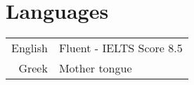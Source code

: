 \documentclass[a4paper,10pt,twoside]{article}
\begin{document}

\section{Languages}

\begin{tabular}{rp{12cm}}
English & Fluent - IELTS Score 8.5\\
Greek & Mother tongue
\end{tabular}\\




\end{document}
